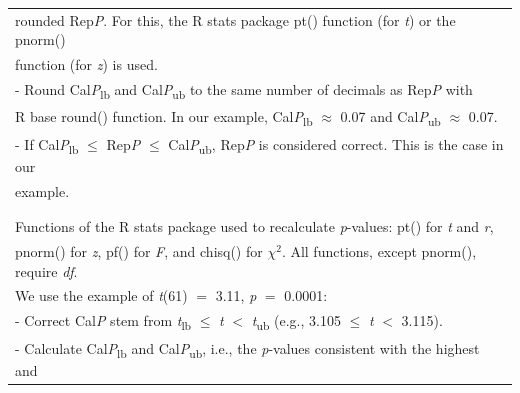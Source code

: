 \documentclass[
  12pt,
]{article}
\begin{document}
\begin{longtable}[t]{l}
\hspace{1em}\hspace{1em}rounded Rep\emph{P}. For this, the R stats package pt() function (for \emph{t}) or the pnorm()\\
\hspace{1em}\hspace{1em}function (for \emph{z}) is used.\\
\hspace{1em}\hspace{1em}- Round Cal\emph{P}\textsubscript{lb} and Cal\emph{P}\textsubscript{ub} to the same number of decimals as Rep\emph{P} with\\
\hspace{1em}\hspace{1em}R base round() function. In our example, Cal\emph{P}\textsubscript{lb} $\approx$ 0.07 and Cal\emph{P}\textsubscript{ub} $\approx$ 0.07.\\
\hspace{1em}\hspace{1em}- If Cal\emph{P}\textsubscript{lb} $\leq$ Rep\emph{P} $\leq$ Cal\emph{P}\textsubscript{ub}, Rep\emph{P} is considered correct. This is the case in our\\
\hspace{1em}\hspace{1em}example.\\
\\
\addlinespace[0.3em]
\multicolumn{1}{l}{\textbf{test statistics}}\\
\hspace{1em}Functions of the R stats package used to recalculate \emph{p}-values: pt() for \emph{t} and \emph{r},\\
\hspace{1em}pnorm() for \emph{z}, pf() for \emph{F}, and chisq() for $\chi^2$. All functions, except pnorm(), require \emph{df}.\\
\hspace{1em}We use the example of \emph{t}(61) $=$ 3.11, \emph{p} $=$ 0.0001:\\
\hspace{1em}\hspace{1em}- Correct Cal\emph{P} stem from \emph{t}\textsubscript{lb} $\leq$ \emph{t} $<$ \emph{t}\textsubscript{ub} (e.g., 3.105 $\leq$ \emph{t} $<$ 3.115).\\
\hspace{1em}\hspace{1em}-   Calculate Cal\emph{P}\textsubscript{lb} and Cal\emph{P}\textsubscript{ub}, i.e., the \emph{p}-values consistent with the highest and\\

\end{longtable}
\end{document}
